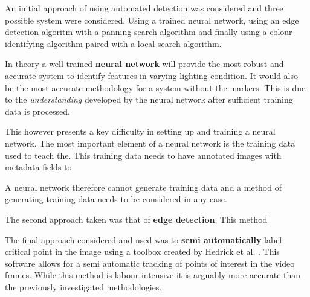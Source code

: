 An initial approach of using automated detection was considered and three possible system were considered. Using a trained neural network, using an edge detection algoritm with a panning search algorithm and finally using a colour identifying algorithm paired with a local search algorithm.

In theory a well trained \textbf{neural network} will provide the most robust and accurate system to identify features in varying lighting condition. It would also be the most accurate methodology for a system without the markers. This is due to the \textit{understanding} developed by the neural network after sufficient training data is processed.

This however presents a key difficulty in setting up and training a neural network. The most important element of a neural network is the training data used to teach the. This training data needs to have annotated images with metadata fields to

A neural network therefore cannot generate training data and a method of generating training data needs to be considered in any case.

The second approach taken was that of \textbf{edge detection}. This method 

The final approach considered and used was to \textbf{semi automatically} label critical point in the image using a toolbox created by Hedrick et al. \cite{hedrick2008software}. This software allows for a semi automatic tracking of points of interest in the video frames. While this method is labour intensive it is arguably more accurate than the previously investigated methodologies.





